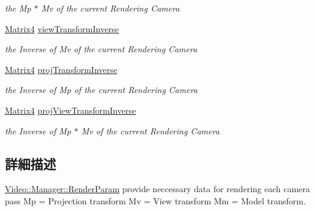 \begin{DoxyCompactItemize}
\begin{DoxyCompactList}\small\item\em the Mp $\ast$ Mv of the current Rendering Camera \end{DoxyCompactList}\item 
\hyperlink{class_i_dream_sky_1_1_matrix4}{Matrix4} \hyperlink{class_i_dream_sky_1_1_video_1_1_manager_1_1_render_param_a00076c41514dfbb13dbfe63137291527}{view\+Transform\+Inverse}\hypertarget{class_i_dream_sky_1_1_video_1_1_manager_1_1_render_param_a00076c41514dfbb13dbfe63137291527}{}\label{class_i_dream_sky_1_1_video_1_1_manager_1_1_render_param_a00076c41514dfbb13dbfe63137291527}

\begin{DoxyCompactList}\small\item\em the Inverse of Mv of the current Rendering Camera \end{DoxyCompactList}\item 
\hyperlink{class_i_dream_sky_1_1_matrix4}{Matrix4} \hyperlink{class_i_dream_sky_1_1_video_1_1_manager_1_1_render_param_ab704dbe471f3a2c1df1ec179e9513d21}{proj\+Transform\+Inverse}\hypertarget{class_i_dream_sky_1_1_video_1_1_manager_1_1_render_param_ab704dbe471f3a2c1df1ec179e9513d21}{}\label{class_i_dream_sky_1_1_video_1_1_manager_1_1_render_param_ab704dbe471f3a2c1df1ec179e9513d21}

\begin{DoxyCompactList}\small\item\em the Inverse of Mp of the current Rendering Camera \end{DoxyCompactList}\item 
\hyperlink{class_i_dream_sky_1_1_matrix4}{Matrix4} \hyperlink{class_i_dream_sky_1_1_video_1_1_manager_1_1_render_param_a92b0febe8954672333caabf4a7acbca6}{proj\+View\+Transform\+Inverse}\hypertarget{class_i_dream_sky_1_1_video_1_1_manager_1_1_render_param_a92b0febe8954672333caabf4a7acbca6}{}\label{class_i_dream_sky_1_1_video_1_1_manager_1_1_render_param_a92b0febe8954672333caabf4a7acbca6}

\begin{DoxyCompactList}\small\item\em the Inverse of Mp $\ast$ Mv of the current Rendering Camera \end{DoxyCompactList}\end{DoxyCompactItemize}


\subsection{詳細描述}
\hyperlink{class_i_dream_sky_1_1_video_1_1_manager_1_1_render_param}{Video\+::\+Manager\+::\+Render\+Param} provide neccessary data for rendering each camera pass Mp = Projection transform Mv = View transform Mm = Model transform. 

